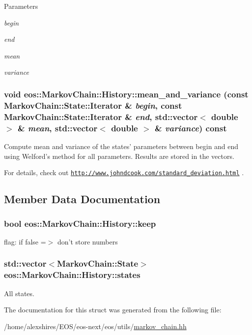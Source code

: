 \begin{DoxyParams}{Parameters}
\item[{\em begin}]\item[{\em end}]\item[{\em mean}]\item[{\em variance}]\end{DoxyParams}
\hypertarget{structeos_1_1MarkovChain_1_1History_a4aa855975e42d10d25e43d327e4ef72a}{
\subsubsection[{mean\_\-and\_\-variance}]{\setlength{\rightskip}{0pt plus 5cm}void eos::MarkovChain::History::mean\_\-and\_\-variance (const {\bf MarkovChain::State::Iterator} \& {\em begin}, \/  const {\bf MarkovChain::State::Iterator} \& {\em end}, \/  std::vector$<$ double $>$ \& {\em mean}, \/  std::vector$<$ double $>$ \& {\em variance}) const}}
\label{structeos_1_1MarkovChain_1_1History_a4aa855975e42d10d25e43d327e4ef72a}
Compute mean and variance of the states' parameters between begin and end using Welford's method for all parameters. Results are stored in the vectors.

For details, check out \href{http://www.johndcook.com/standard_deviation.html}{\tt http://www.johndcook.com/standard\_\-deviation.html} . 

\subsection{Member Data Documentation}
\hypertarget{structeos_1_1MarkovChain_1_1History_ac6b8c02c837f78b6724fcaa1cb4eaa74}{
\subsubsection[{keep}]{\setlength{\rightskip}{0pt plus 5cm}bool {\bf eos::MarkovChain::History::keep}}}
\label{structeos_1_1MarkovChain_1_1History_ac6b8c02c837f78b6724fcaa1cb4eaa74}


flag: if false =$>$ don't store numbers \hypertarget{structeos_1_1MarkovChain_1_1History_acecd7f35ce23b811f5365bb96446fba8}{
\subsubsection[{states}]{\setlength{\rightskip}{0pt plus 5cm}std::vector$<${\bf MarkovChain::State}$>$ {\bf eos::MarkovChain::History::states}}}
\label{structeos_1_1MarkovChain_1_1History_acecd7f35ce23b811f5365bb96446fba8}


All states. 

The documentation for this struct was generated from the following file:\begin{DoxyCompactItemize}
\item 
/home/alexshires/EOS/eos-\/next/eos/utils/\hyperlink{markov__chain_8hh}{markov\_\-chain.hh}\end{DoxyCompactItemize}
